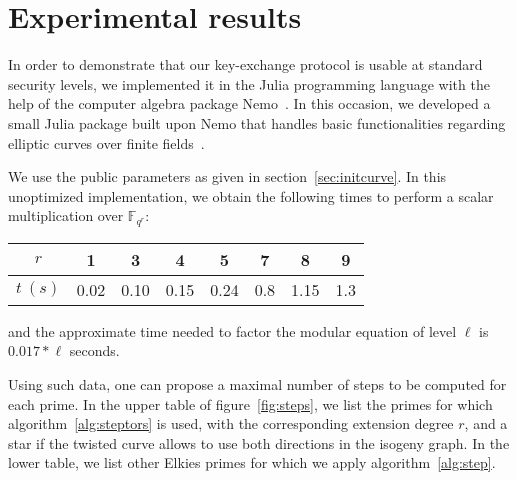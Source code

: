 \documentclass{article}
\newcommand{\F}{\mathbb{F}}
\theoremstyle{definition}
\begin{document}
\section{Experimental results}
\label{sec:exp}

In order to demonstrate that our key-exchange protocol is usable
at standard security levels, we implemented it in the Julia
programming language with the help of the computer algebra package
Nemo~\cite{todo:Nemo}. In this occasion, we developed a small
Julia package built upon Nemo that handles basic functionalities
regarding elliptic curves over finite fields~\cite{todo:package}.

We use the public parameters as given in
section~\ref{sec:initcurve}.
In this unoptimized implementation, we obtain
the following times to perform a scalar multiplication over $\F_{q^r}$:

\begin{center}
\begin{tabular}{c|ccccccc}
$r$ & 1 & 3 & 4 & 5 & 7 & 8 & 9 \\
\hline
$t\ (s)$ & 0.02 & 0.10 & 0.15 & 0.24 & 0.8 & 1.15 & 1.3
\end{tabular}
\end{center}

and the approximate time needed to factor the modular equation of level $\ell$
is $0.017 * \ell$ seconds.

Using such data, one can propose a maximal number of steps to be
computed for each prime. In the upper table of figure~\ref{fig:steps}, we
list the primes for which algorithm~\ref{alg:steptors} is used, with
the corresponding extension degree $r$, and a star if the twisted curve
allows to use both directions in the isogeny graph. In the lower table,
we list other Elkies primes for which we apply algorithm~\ref{alg:step}.
\end{document}
